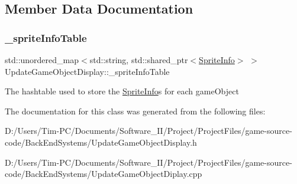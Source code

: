 \subsection{Member Data Documentation}
\mbox{\label{class_update_game_object_display_a51ae3f07958294b737885c9a0bd86153}} 
\subsubsection{\texorpdfstring{\+\_\+sprite\+Info\+Table}{\_spriteInfoTable}}
{\footnotesize\ttfamily std\+::unordered\+\_\+map$<$std\+::string, std\+::shared\+\_\+ptr$<$\hyperlink{struct_sprite_info}{Sprite\+Info}$>$ $>$ Update\+Game\+Object\+Display\+::\+\_\+sprite\+Info\+Table\hspace{0.3cm}{\ttfamily [private]}}

The hashtable used to store the \hyperlink{struct_sprite_info}{Sprite\+Info}\textquotesingle{}s for each game\+Object 

The documentation for this class was generated from the following files\+:\begin{DoxyCompactItemize}
\item 
D\+:/\+Users/\+Tim-\/\+P\+C/\+Documents/\+Software\+\_\+\+I\+I/\+Project/\+Project\+Files/game-\/source-\/code/\+Back\+End\+Systems/Update\+Game\+Object\+Display.\+h\item 
D\+:/\+Users/\+Tim-\/\+P\+C/\+Documents/\+Software\+\_\+\+I\+I/\+Project/\+Project\+Files/game-\/source-\/code/\+Back\+End\+Systems/Update\+Game\+Object\+Diplay.\+cpp\end{DoxyCompactItemize}
